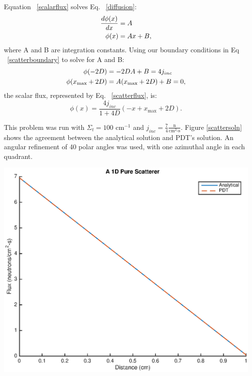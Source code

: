 Equation ~\eqref{scalarflux} solves Eq. ~\eqref{diffusion}:
\begin{align}
\frac{d\phi(x)}{dx} &= A \notag \\
\phi(x) &= Ax + B,
\label{scalarflux}
\end{align}
where A and B are integration constants. Using our boundary conditions in Eq ~\eqref{scatterboundary} to solve for A and B:
\begin{align}
\phi(-2D) &= -2DA + B = 4j_{inc} \notag \\
\phi(x_{\text{max}} + 2D) &= A(x_{\text{max}} + 2D) + B = 0, \notag
\label{notimportant}
\end{align}
the scalar flux, represented by Eq. ~\eqref{scatterflux}, is:
\begin{equation}
\phi(x) = \frac{4j_{inc}}{1+4D}(-x + x_{\text{max}} + 2D).
\label{scatterflux}
\end{equation}

This problem was run with $\Sigma_t = 100 \text{ cm}^{-1}$ and $j_{inc} = \frac{7}{4} \frac{\text{n}}{\text{cm}^2\text{-s}}$. Figure \ref{scattersoln} shows the agreement between the analytical solution and PDT's solution. An angular refinement of 40 polar angles was used, with one azimuthal angle in each quadrant.

\bigskip

\noindent\begin{minipage}{\textwidth}
\centering
\includegraphics[scale = 0.8]{figures/PureScatterer.eps}
\label{scattersoln}
\end{minipage}
\smallskip

